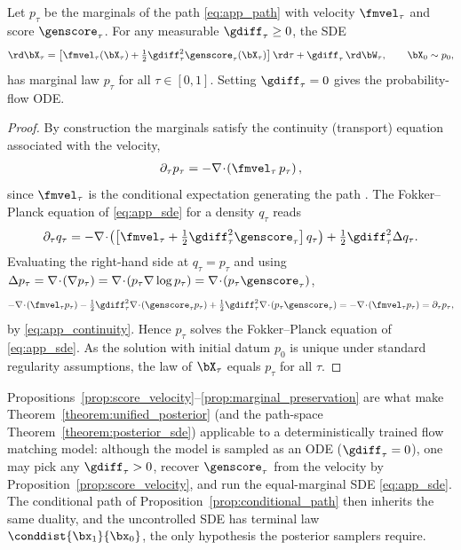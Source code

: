 \begin{proposition}\label{prop:marginal_preservation}
Let $p_\tau$ be the marginals of the path \eqref{eq:app_path} with velocity $\fmvel_\tau$ and score $\genscore_\tau$. For any measurable $\gdiff_\tau\ge0$, the SDE
\begin{align}\label{eq:app_sde}
    \rd\bX_\tau = \left[\fmvel_\tau(\bX_\tau) + \tfrac12\gdiff_\tau^2\genscore_\tau(\bX_\tau)\right]\rd\tau + \gdiff_\tau\,\rd\bW_\tau,
    \qquad \bX_0\sim p_0,
\end{align}
has marginal law $p_\tau$ for all $\tau\in[0,1]$. Setting $\gdiff_\tau=0$ gives the probability-flow ODE.
\end{proposition}
\begin{proof}
By construction the marginals satisfy the continuity (transport) equation associated with the velocity,
\begin{align}\label{eq:app_continuity}
    \partial_\tau p_\tau = -\nabla\!\cdot\!\left(\fmvel_\tau\,p_\tau\right),
\end{align}
since $\fmvel_\tau$ is the conditional expectation generating the path \cite{lipman_flow_2023, albergo_stochastic_2023}. The Fokker--Planck equation of \eqref{eq:app_sde} for a density $q_\tau$ reads
\begin{align}
    \partial_\tau q_\tau
    = -\nabla\!\cdot\!\left(\left[\fmvel_\tau + \tfrac12\gdiff_\tau^2\genscore_\tau\right]q_\tau\right)
    + \tfrac12\gdiff_\tau^2\Delta q_\tau .
\end{align}
Evaluating the right-hand side at $q_\tau=p_\tau$ and using $\Delta p_\tau = \nabla\!\cdot\!(\nabla p_\tau) = \nabla\!\cdot\!(p_\tau\nabla\log p_\tau) = \nabla\!\cdot\!(p_\tau\genscore_\tau)$,
\begin{align}
    -\nabla\!\cdot\!\left(\fmvel_\tau p_\tau\right)
    - \tfrac12\gdiff_\tau^2\nabla\!\cdot\!\left(\genscore_\tau p_\tau\right)
    + \tfrac12\gdiff_\tau^2\nabla\!\cdot\!\left(p_\tau\genscore_\tau\right)
    = -\nabla\!\cdot\!\left(\fmvel_\tau p_\tau\right)
    = \partial_\tau p_\tau,
\end{align}
by \eqref{eq:app_continuity}. Hence $p_\tau$ solves the Fokker--Planck equation of \eqref{eq:app_sde}. As the solution with initial datum $p_0$ is unique under standard regularity assumptions, the law of $\bX_\tau$ equals $p_\tau$ for all $\tau$.
\end{proof}

\begin{remark}
Propositions~\ref{prop:score_velocity}--\ref{prop:marginal_preservation} are what make Theorem~\ref{theorem:unified_posterior} (and the path-space Theorem~\ref{theorem:posterior_sde}) applicable to a deterministically trained flow matching model: although the model is sampled as an ODE ($\gdiff_\tau=0$), one may pick any $\gdiff_\tau>0$, recover $\genscore_\tau$ from the velocity by Proposition~\ref{prop:score_velocity}, and run the equal-marginal SDE \eqref{eq:app_sde}. The conditional path of Proposition~\ref{prop:conditional_path} then inherits the same duality, and the uncontrolled SDE has terminal law $\conddist{\bx_1}{\bx_0}$, the only hypothesis the posterior samplers require.
\end{remark}
